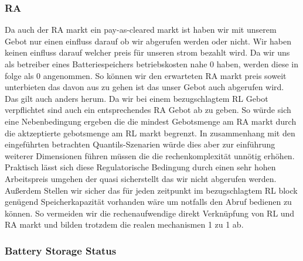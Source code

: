 \subsubsection{RA}
Da auch der RA markt ein pay-as-cleared markt ist haben wir mit unserem Gebot nur einen einfluss darauf ob wir abgerufen werden oder nicht.
Wir haben keinen einfluss darauf welcher preis für unseren strom bezahlt wird.
Da wir uns als betreiber eines Batteriespeichers betriebskosten nahe 0 haben, werden diese in folge als 0 angenommen.
So können wir den erwarteten RA markt preis soweit unterbieten das davon aus zu gehen
ist das unser Gebot auch abgerufen wird. Das gilt auch anders herum. Da wir bei einem bezugschlagtem RL Gebot
verpflichtet sind auch ein entsprechendes RA Gebot ab zu geben. So würde sich eine Nebenbedingung ergeben die die
mindest Gebotsmenge am RA markt durch die aktzeptierte gebotsmenge am RL markt begrenzt. In zusammenhang mit den eingeführten betrachten
Quantils-Szenarien würde dies aber zur einführung weiterer Dimensionen führen müssen die die rechenkomplexität unnötig erhöhen.
Praktisch lässt sich diese Regulatorische Bedingung durch einen sehr hohen Arbeitspreis umgehen der quasi sicherstellt das wir nicht abgerufen werden.
Außerdem Stellen wir sicher das für jeden zeitpunkt im bezugschlagtem RL block genügend Speicherkapazität vorhanden wäre um notfalls
den Abruf bedienen zu können. So vermeiden wir die rechenaufwendige direkt Verknüpfung von RL und RA markt und bilden trotzdem die realen mechanismen 1 zu 1 ab.

\subsubsection{Battery Storage Status}
